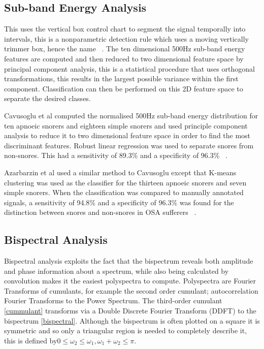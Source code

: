 \subsection{Sub-band Energy Analysis}
This uses the vertical box control chart to segment the signal temporally into intervals, this is a nonparametric detection rule which uses a moving vertically trimmer box, hence the name ~\cite{vbox}. The ten dimensional 500Hz sub-band energy features are computed and then reduced to two dimensional feature space by principal component analysis, this is a statistical procedure that uses orthogonal transformations, this results in the largest possible variance within the first component. Classification can then be performed on this 2D feature space to separate the desired classes. 

Cavusoglu et al computed the normalised 500Hz sub-band energy distribution for ten apnoeic snorers and eighteen simple snorers and used principle component analysis to reduce it to two dimensional feature space in order to find the most discriminant features. Robust linear regression was used to separate snores from non-snores. This had a sensitivity of 89.3\% and a specificity of 96.3\% ~\cite{cavusoglu2007efficient}.

Azarbarzin et al used a similar method to Cavusoglu except that K-means clustering was used as the classifier for the thirteen apnoeic snorers and seven simple snorers. When the classification was compared to manually annotated signals, a sensitivity of 94.8\% and a specificity of 96.3\% was found for the distinction between snores and non-snores in OSA sufferers ~\cite{azarbarzin2010unsupervised}.
\subsection{Bispectral Analysis}
Bispectral analysis exploits the fact that the bispectrum reveals both amplitude and phase information about a spectrum, while also being calculated by convolution makes it the easiest polyspectra to compute. Polyspectra are Fourier Transforms of cumulants, for example the second order cumulant; autocorrelation Fourier Transforms to the Power Spectrum. The third-order cumulant \eqref{cummulant} transforms via a Double Discrete Fourier Transform (DDFT) to the bispectrum \eqref{bispectral}. Although the bispectrum is often plotted on a square it is symmetric and so only a triangular region is needed to completely describe it, this is defined by$ 0\leq \omega_2 \leq \omega_1, \omega_1 + \omega_2 \leq \pi $.

